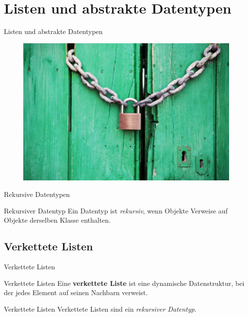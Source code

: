 \documentclass[18pt]{beamer}
\begin{document}
\section{Listen und abstrakte Datentypen}

\begin{frame}{Listen und abstrakte Datentypen}
    \begin{figure}
        \includegraphics[scale=.3]{img/AD76394B17.jpg}
    \end{figure}
\end{frame}

\begin{frame}{Rekursive Datentypen}
    \begin{block}{Rekursiver Datentyp}
        Ein Datentyp ist \textit{rekursiv}, wenn Objekte Verweise auf Objekte derselben Klasse enthalten.
    \end{block}
\end{frame}


\subsection{Verkettete Listen}

\begin{frame}{Verkettete Listen}
    \begin{block}{Verkettete Listen}
        Eine \textbf{verkettete Liste} ist eine dynamische Datenstruktur, bei der jedes Element auf seinen Nachbarn verweist.
    \end{block}

\end{frame}

\begin{frame}{Verkettete Listen}
    Verkettete Listen sind ein \textit{rekursiver Datentyp}.
\end{frame}
\end{document}
